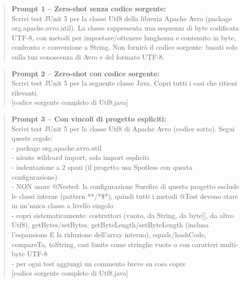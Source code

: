 \begin{table}[h]
\centering
\begin{minipage}{0.95\textwidth}
\begin{quote}
\ttfamily\small
\textbf{Prompt 1 -- Zero-shot senza codice sorgente:}\\[4pt]
Scrivi test JUnit 5 per la classe Utf8 della libreria Apache Avro (package org.apache.avro.util).
La classe rappresenta una sequenza di byte codificata UTF-8, con metodi per impostare/ottenere
lunghezza e contenuto in byte, confronto e conversione a String. Non fornirò il codice sorgente:
basati solo sulla tua conoscenza di Avro e del formato UTF-8.
\end{quote}

\begin{quote}
\ttfamily\small
\textbf{Prompt 2 -- Zero-shot con codice sorgente:}\\[4pt]
Scrivi test JUnit 5 per la seguente classe Java. Copri tutti i casi che ritieni rilevanti.\\[4pt]
{[}codice sorgente completo di Utf8.java{]}
\end{quote}

\begin{quote}
\ttfamily\small
\textbf{Prompt 3 -- Con vincoli di progetto espliciti:}\\[4pt]
Scrivi test JUnit 5 per la classe Utf8 di Apache Avro (codice sotto).
Segui queste regole:\\
- package org.apache.avro.util\\
- niente wildcard import, solo import espliciti\\
- indentazione a 2 spazi (il progetto usa Spotless con questa configurazione)\\
- NON usare @Nested: la configurazione Surefire di questo progetto esclude le classi
  interne (pattern **{/}*\$*), quindi tutti i metodi @Test devono stare in
  un'unica classe a livello singolo\\
- copri sistematicamente: costruttori (vuoto, da String, da byte[], da altro Utf8),
  getBytes/setBytes, getByteLength/setByteLength (inclusa l'espansione E la riduzione
  dell'array interno), equals/hashCode, compareTo, toString, casi limite come stringhe
  vuote o con caratteri multi-byte UTF-8\\
- per ogni test aggiungi un commento breve su cosa copre\\[4pt]
{[}codice sorgente completo di Utf8.java{]}
\end{quote}
\end{minipage}
\caption{Testo completo dei tre prompt utilizzati per la generazione LLM su \texttt{Utf8}.}
\label{tab:prompt-utf8}
\end{table}

